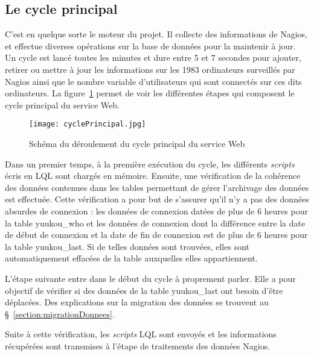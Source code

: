 \subsection{Le cycle principal}
\label{section:cyclePrincipal}

C'est en quelque sorte le moteur du projet.
Il collecte des informations de Nagios, et effectue diverses op\'erations sur la base de donn\'ees pour la maintenir \`a jour.
Un cycle est lanc\'e toutes les minutes et dure entre 5 et 7 secondes pour ajouter, retirer ou mettre \`a jour les informations sur les 1983 ordinateurs surveill\'es par Nagios ainsi que le nombre variable d'utilisateurs qui sont connect\'es sur ces dits ordinateurs.
La figure~\ref{figure:cyclePrincipal} permet de voir les diff\'erentes \'etapes qui composent le cycle principal du service Web.

\begin{figure}[!ht]
	\centering
	\texttt{[image: cyclePrincipal.jpg]}
	\caption{Sch\'ema du d\'eroulement du cycle principal du service Web}
	\label{figure:cyclePrincipal}
	
\end{figure}

Dans un premier temps, \`a la premi\`ere ex\'ecution du cycle, les diff\'erents \textit{scripts} \'ecris en LQL sont charg\'es en m\'emoire.
Ensuite, une v\'erification de la coh\'erence des donn\'ees contenues dans les tables permettant de g\'erer l'archivage des donn\'ees est effectu\'ee.
Cette v\'erification a pour but de s'assurer qu'il n'y a pas des donn\'ees absurdes de connexion : les donn\'ees de connexion dat\'ees de plus de 6 heures pour la table \textsf{yuukou\_who} et les donn\'ees de connexion dont la diff\'erence entre la date de d\'ebut de connexion et la date de fin de connexion est de plus de 6 heures pour la table \textsf{yuukou\_last}.
Si de telles donn\'ees sont trouv\'ees, elles sont automatiquement effac\'ees de la table auxquelles elles appartiennent.

L'\'etape suivante entre dans le d\'ebut du cycle \`a proprement parler.
Elle a pour objectif de v\'erifier si des donn\'ees de la table \textsf{yuukou\_last} ont besoin d'\^etre d\'eplac\'ees.
Des explications sur la migration des donn\'ees se trouvent au \S~\ref{section:migrationDonnees}.

Suite \`a cette v\'erification, les \textit{scripts} LQL sont envoy\'es et les informations r\'ecup\'er\'ees sont transmises \`a l'\'etape de traitements des donn\'ees Nagios.

